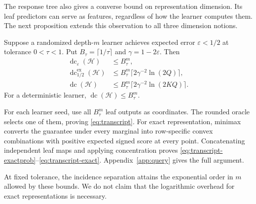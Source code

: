 \documentclass[11pt,letterpaper,pmlr,twoside]{jmlr}
\newcommand{\Hc}{\mathcal H}
\newcommand{\eps}{\varepsilon}
\newcommand{\dc}{\operatorname{dc}}
\newcommand{\edc}{\operatorname{dc}^{\mathrm{ex}}_{1/2}}
\newcommand{\ceil}[1]{\lceil #1\rceil}
\begin{document}
The response tree also gives a converse bound on representation dimension. Its leaf predictors can serve as features, regardless of how the learner computes them. The next proposition extends this observation to all three dimension notions.

\begin{proposition}\label{prop:transcript}
Suppose a randomized depth-$m$ learner achieves expected error $\eps<1/2$ at tolerance $0<\tau<1$. Put $B_\tau=\ceil{1/\tau}$ and $\gamma=1-2\eps$. Then
\begin{align}
 \dc_\eps(\Hc)&\le B_\tau^m,\label{eq:transcript}\\
 \edc(\Hc)&\le B_\tau^m\ceil{2\gamma^{-2}\ln(2Q)},\label{eq:transcript-exactprob}\\
 \dc(\Hc)&\le B_\tau^m\ceil{2\gamma^{-2}\ln(2KQ)}.\label{eq:transcript-exact}
\end{align}
For a deterministic learner, $\dc(\Hc)\le B_\tau^m$.
\end{proposition}

For each learner seed, use all $B_\tau^m$ leaf outputs as coordinates. The rounded oracle selects one of them, proving \eqref{eq:transcript}. For exact representation, minimax converts the guarantee under every marginal into row-specific convex combinations with positive expected signed score at every point. Concatenating independent leaf maps and applying concentration proves \eqref{eq:transcript-exactprob}--\eqref{eq:transcript-exact}. Appendix~\ref{app:query} gives the full argument.

At fixed tolerance, the incidence separation attains the exponential order in $m$ allowed by these bounds. We do not claim that the logarithmic overhead for exact representations is necessary.
\end{document}

